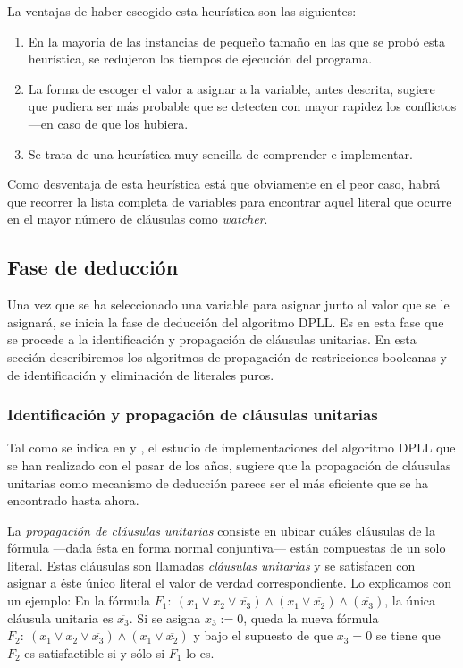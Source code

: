 \documentclass[12pt,lettersize,oneside]{article}
\begin{document}
La ventajas de haber escogido esta heurística son las siguientes:
\begin{enumerate}
\item En la mayoría de las instancias de pequeño tamaño en las que se probó esta
  heurística, se redujeron los tiempos de ejecución del programa.
\item La forma de escoger el valor a asignar a la variable, antes descrita,
  sugiere que pudiera ser más probable que se detecten con mayor rapidez los
  conflictos ---en caso de que los hubiera.
\item Se trata de una heurística muy sencilla de comprender e implementar.
\end{enumerate}

Como desventaja de esta heurística está que obviamente en el peor caso, habrá
que recorrer la lista completa de variables para encontrar aquel literal que
ocurre en el mayor número de cláusulas como \emph{watcher}.

\subsection{Fase de deducción}

Una vez que se ha seleccionado una variable para asignar junto al valor que se
le asignará, se inicia la fase de deducción del algoritmo DPLL. Es en esta fase
que se procede a la identificación y propagación de cláusulas unitarias. En esta
sección describiremos los algoritmos de propagación de restricciones booleanas y
de identificación y eliminación de literales puros.


\subsubsection{Identificación y propagación de cláusulas
  unitarias}\label{UnitPropagation}
Tal como se indica en \cite{Zhang} y \cite{ZhangThesis}, el estudio de
implementaciones del algoritmo DPLL que se han realizado con el pasar de los
años, sugiere que la propagación de cláusulas unitarias como mecanismo de
deducción parece ser el más eficiente que se ha encontrado hasta ahora.

La \emph{propagación de cláusulas unitarias} consiste en ubicar cuáles cláusulas
de la fórmula ---dada ésta en forma normal conjuntiva--- están compuestas de un
solo literal. Estas cláusulas son llamadas \emph{cláusulas unitarias} y se
satisfacen con asignar a éste único literal el valor de verdad correspondiente.
Lo explicamos con un ejemplo: En la fórmula $F_1:\ (x_1 \vee x_2 \vee
\overline{x_3}) \wedge (x_1 \vee \overline{x_2}) \wedge (\overline{x_3})$, la
única cláusula unitaria es $\overline{x_3}$. Si se asigna $x_3:=0$, queda la
nueva fórmula $F_2:\ (x_1 \vee x_2 \vee \overline{x_3}) \wedge (x_1 \vee
\overline{x_2}) $ y bajo el supuesto de que $x_3=0$ se tiene que $F_2$ es
satisfactible si y sólo si $F_1$ lo es.
\end{document}
